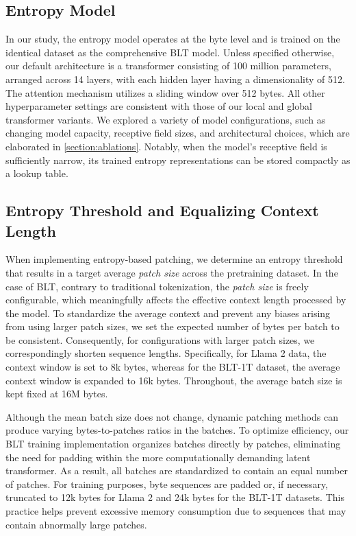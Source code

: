 \subsection{Entropy Model} In our study, the entropy model operates at the byte level and is trained on the identical dataset as the comprehensive {\textsc BLT} model. Unless specified otherwise, our default architecture is a transformer consisting of 100 million parameters, arranged across 14 layers, with each hidden layer having a dimensionality of 512. The attention mechanism utilizes a sliding window over 512 bytes. All other hyperparameter settings are consistent with those of our local and global transformer variants. We explored a variety of model configurations, such as changing model capacity, receptive field sizes, and architectural choices, which are elaborated in \autoref{section:ablations}. Notably, when the model’s receptive field is sufficiently narrow, its trained entropy representations can be stored compactly as a lookup table.

\subsection{Entropy Threshold and Equalizing Context Length} When implementing entropy-based patching, we determine an entropy threshold that results in a target average \textit{patch size} across the pretraining dataset. In the case of {\textsc BLT}, contrary to traditional tokenization, the \textit{patch size} is freely configurable, which meaningfully affects the effective context length processed by the model. To standardize the average context and prevent any biases arising from using larger patch sizes, we set the expected number of bytes per batch to be consistent. Consequently, for configurations with larger patch sizes, we correspondingly shorten sequence lengths. Specifically, for Llama 2 data, the context window is set to 8k bytes, whereas for the {\textsc BLT}-1T dataset, the average context window is expanded to 16k bytes. Throughout, the average batch size is kept fixed at 16M bytes.

Although the mean batch size does not change, dynamic patching methods can produce varying bytes-to-patches ratios in the batches. To optimize efficiency, our {\textsc BLT} training implementation organizes batches directly by patches, eliminating the need for padding within the more computationally demanding latent transformer. As a result, all batches are standardized to contain an equal number of patches. For training purposes, byte sequences are padded or, if necessary, truncated to 12k bytes for Llama 2 and 24k bytes for the {\textsc BLT}-1T datasets. This practice helps prevent excessive memory consumption due to sequences that may contain abnormally large patches.

